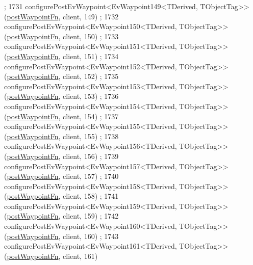 \begin{DoxyCode}
      ;
1731     configurePostEvWaypoint<EvWaypoint149<TDerived, TObjectTag>>(\hyperlink{classcl__move__base__z_1_1WaypointEventDispatcher_a964a57fcce5d48ec60243230722d8dd7}{postWaypointFn}, client, 149)
      ;
1732     configurePostEvWaypoint<EvWaypoint150<TDerived, TObjectTag>>(\hyperlink{classcl__move__base__z_1_1WaypointEventDispatcher_a964a57fcce5d48ec60243230722d8dd7}{postWaypointFn}, client, 150)
      ;
1733     configurePostEvWaypoint<EvWaypoint151<TDerived, TObjectTag>>(\hyperlink{classcl__move__base__z_1_1WaypointEventDispatcher_a964a57fcce5d48ec60243230722d8dd7}{postWaypointFn}, client, 151)
      ;
1734     configurePostEvWaypoint<EvWaypoint152<TDerived, TObjectTag>>(\hyperlink{classcl__move__base__z_1_1WaypointEventDispatcher_a964a57fcce5d48ec60243230722d8dd7}{postWaypointFn}, client, 152)
      ;
1735     configurePostEvWaypoint<EvWaypoint153<TDerived, TObjectTag>>(\hyperlink{classcl__move__base__z_1_1WaypointEventDispatcher_a964a57fcce5d48ec60243230722d8dd7}{postWaypointFn}, client, 153)
      ;
1736     configurePostEvWaypoint<EvWaypoint154<TDerived, TObjectTag>>(\hyperlink{classcl__move__base__z_1_1WaypointEventDispatcher_a964a57fcce5d48ec60243230722d8dd7}{postWaypointFn}, client, 154)
      ;
1737     configurePostEvWaypoint<EvWaypoint155<TDerived, TObjectTag>>(\hyperlink{classcl__move__base__z_1_1WaypointEventDispatcher_a964a57fcce5d48ec60243230722d8dd7}{postWaypointFn}, client, 155)
      ;
1738     configurePostEvWaypoint<EvWaypoint156<TDerived, TObjectTag>>(\hyperlink{classcl__move__base__z_1_1WaypointEventDispatcher_a964a57fcce5d48ec60243230722d8dd7}{postWaypointFn}, client, 156)
      ;
1739     configurePostEvWaypoint<EvWaypoint157<TDerived, TObjectTag>>(\hyperlink{classcl__move__base__z_1_1WaypointEventDispatcher_a964a57fcce5d48ec60243230722d8dd7}{postWaypointFn}, client, 157)
      ;
1740     configurePostEvWaypoint<EvWaypoint158<TDerived, TObjectTag>>(\hyperlink{classcl__move__base__z_1_1WaypointEventDispatcher_a964a57fcce5d48ec60243230722d8dd7}{postWaypointFn}, client, 158)
      ;
1741     configurePostEvWaypoint<EvWaypoint159<TDerived, TObjectTag>>(\hyperlink{classcl__move__base__z_1_1WaypointEventDispatcher_a964a57fcce5d48ec60243230722d8dd7}{postWaypointFn}, client, 159)
      ;
1742     configurePostEvWaypoint<EvWaypoint160<TDerived, TObjectTag>>(\hyperlink{classcl__move__base__z_1_1WaypointEventDispatcher_a964a57fcce5d48ec60243230722d8dd7}{postWaypointFn}, client, 160)
      ;
1743     configurePostEvWaypoint<EvWaypoint161<TDerived, TObjectTag>>(\hyperlink{classcl__move__base__z_1_1WaypointEventDispatcher_a964a57fcce5d48ec60243230722d8dd7}{postWaypointFn}, client, 161)

\end{DoxyCode}
